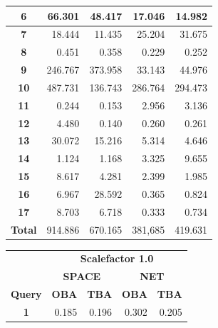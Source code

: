 \documentclass[a4paper]{article}
\begin{document}
\begin{figure}[h]
\begin{minipage}{0.5\linewidth}
\begin{tiny}
\begin{tabular}{|c|r|r|r|r|}
        \textbf{6}     &   66.301     &   48.417      &   17.046     &   14.982\\
        \hline
        \textbf{7}     &   18.444     &   11.435      &   25.204     &   31.675\\
        \hline
        \textbf{8}     &    0.451     &    0.358      &    0.229     &    0.252\\
        \hline
        \textbf{9}     &  246.767     &  373.958      &   33.143     &   44.976\\
        \hline
        \textbf{10}    &  487.731     &  136.743      &  286.764     &  294.473\\
        \hline
        \textbf{11}    &    0.244     &    0.153      &    2.956     &    3.136\\
        \hline
        \textbf{12}    &    4.480     &    0.140      &    0.260     &    0.261\\
        \hline
        \textbf{13}    &   30.072     &   15.216      &    5.314     &    4.646\\
        \hline
        \textbf{14}    &    1.124     &    1.168      &    3.325     &    9.655\\
        \hline
        \textbf{15}    &    8.617     &    4.281      &    2.399     &    1.985\\
        \hline
        \textbf{16}    &    6.967     &   28.592      &    0.365     &    0.824\\
        \hline
        \textbf{17}    &    8.703     &    6.718      &    0.333     &    0.734\\
        \hline
        \textbf{Total} &  914.886     &  670.165      &  381,685     &  419.631\\
        \hline
      \end{tabular}
    \end{tiny}
  \end{minipage}\hfill
\begin{minipage}{0.5\linewidth}
    \begin{tiny}
      \begin{tabular}{|c|r|r|r|r|}
        \hline
        &\multicolumn{4}{c|}{\textbf{Scalefactor 1.0}}\\
        \cline{2-5}
        &\multicolumn{2}{c|}{\textbf{SPACE}}&\multicolumn{2}{c|}{\textbf{NET}}\\
        \hline
        \textbf{Query} & \textbf{OBA} & \textbf{TBA} & \textbf{OBA} & \textbf{TBA}\\
        \hline
        \textbf{1}     &      0.185   &      0.196   &      0.302   &      0.205\\

\end{tabular}
\end{tiny}
\end{minipage}
\end{figure}
\end{document}
